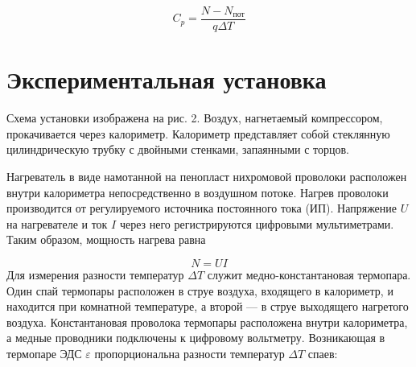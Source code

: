 \documentclass[12pt,a4paper]{article}
\begin{document}
\begin{equation}
C_p = \dfrac{N - N_{\text{пот}}}{q \Delta T} 
\end{equation}

\section{Экспериментальная установка}
 
 Схема установки изображена на рис. 2. Воздух, нагнетаемый компрессором, прокачивается через калориметр. Калориметр представляет собой стеклянную цилиндрическую трубку с двойными стенками, запаянными с торцов.
	
		\begin{figure}[h!]
		\end{figure}
	
		Нагреватель в виде намотанной на пенопласт нихромовой проволоки расположен внутри калориметра непосредственно в воздушном потоке. Нагрев проволоки производится от регулируемого источника постоянного тока (ИП).
		Напряжение $U$ на нагревателе и ток $I$ через него регистрируются цифровыми мультиметрами. Таким образом, мощность нагрева равна
		
		\begin{equation}
		    N= UI
		\end{equation}
		Для измерения разности температур $\Delta T$ служит медно-константановая
		термопара. Один спай термопары расположен в струе воздуха, входящего в
		калориметр, и находится при комнатной температуре, а второй — в струе выходящего нагретого воздуха. Константановая проволока термопары расположена внутри калориметра, а медные проводники подключены к цифровому вольтметру. Возникающая в термопаре ЭДС $\varepsilon$ пропорциональна разности температур $\Delta T$ спаев: 
		
\end{document}
